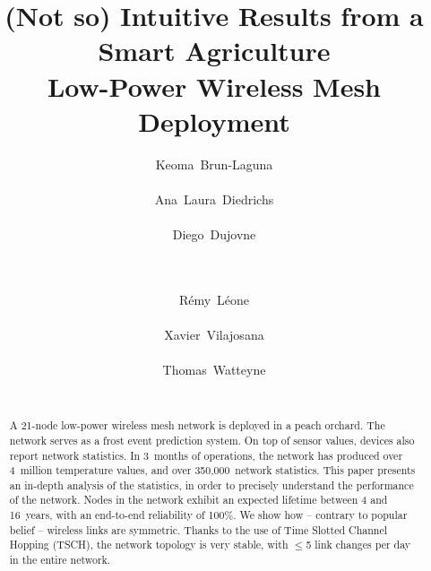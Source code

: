 \documentclass{sig-alternate}
\begin{document}
\title{(Not so) Intuitive Results from a Smart Agriculture\\Low-Power Wireless Mesh Deployment}

\author{
    \alignauthor Keoma~Brun-Laguna\\
        \\
    \alignauthor Ana~Laura~Diedrichs\\
        \\
    \alignauthor Diego~Dujovne\\
        \\
        \\
    \and
    \alignauthor R\'emy~L\'eone\\
        \\
    \alignauthor Xavier~Vilajosana\\
        \\
    \alignauthor Thomas~Watteyne\\
        \\
}

\maketitle

\begin{abstract}
A 21-node low-power wireless mesh network is deployed in a peach orchard.
The network serves as a frost event prediction system.
On top of sensor values, devices also report network statistics.
In 3~months of operations, the network has produced over 4~million temperature values, and over 350,000~network statistics.
This paper presents an in-depth analysis of the statistics, in order to precisely understand the performance of the network.
Nodes in the network exhibit an expected lifetime between 4 and 16~years, with an end-to-end reliability of 100\%.
We show how -- contrary to popular belief -- wireless links are symmetric.
Thanks to the use of Time Slotted Channel Hopping (TSCH), the network topology is very stable, with $\leq$5 link changes per day in the entire network.
\end{abstract}
\end{document}
